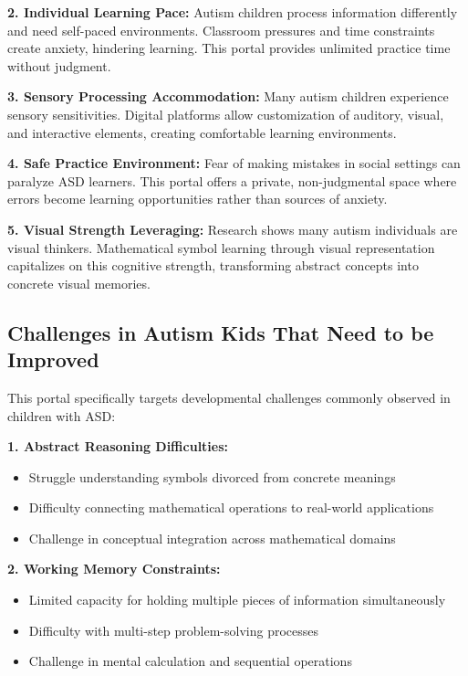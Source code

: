\documentclass[11pt, a4paper]{article}
\begin{document}
\textbf{2. Individual Learning Pace:} Autism children process information differently and need self-paced environments. Classroom pressures and time constraints create anxiety, hindering learning. This portal provides unlimited practice time without judgment.

\textbf{3. Sensory Processing Accommodation:} Many autism children experience sensory sensitivities. Digital platforms allow customization of auditory, visual, and interactive elements, creating comfortable learning environments.

\textbf{4. Safe Practice Environment:} Fear of making mistakes in social settings can paralyze ASD learners. This portal offers a private, non-judgmental space where errors become learning opportunities rather than sources of anxiety.

\textbf{5. Visual Strength Leveraging:} Research shows many autism individuals are visual thinkers. Mathematical symbol learning through visual representation capitalizes on this cognitive strength, transforming abstract concepts into concrete visual memories.

\subsection{Challenges in Autism Kids That Need to be Improved}

This portal specifically targets developmental challenges commonly observed in children with ASD:

\textbf{1. Abstract Reasoning Difficulties:}
\begin{itemize}[leftmargin=*, noitemsep]
    \item Struggle understanding symbols divorced from concrete meanings
    \item Difficulty connecting mathematical operations to real-world applications
    \item Challenge in conceptual integration across mathematical domains
\end{itemize}

\textbf{2. Working Memory Constraints:}
\begin{itemize}[leftmargin=*, noitemsep]
    \item Limited capacity for holding multiple pieces of information simultaneously
    \item Difficulty with multi-step problem-solving processes
    \item Challenge in mental calculation and sequential operations
\end{itemize}
\end{document}
